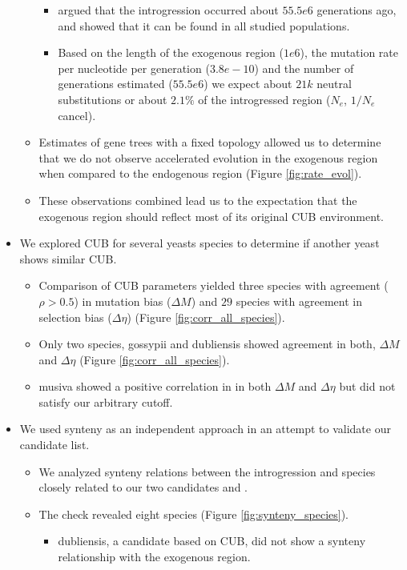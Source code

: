 \documentclass[12pt]{article}
\begin{document}
\begin{itemize}
\begin{itemize}
		\begin{itemize}
			\item \citep{friedrich2015} argued that the introgression occurred about $55.5e6$ generations ago, and showed that it can be found in all studied \kluyveri populations.
			\item Based on the length of the exogenous region ($1e6$), the mutation rate per nucleotide per generation ($3.8e-10$) and the number of generations estimated ($55.5e6$) we expect about $21k$ neutral substitutions or about $2.1 \%$ of the introgressed region ($N_e$, $1/N_e$ cancel).
		\end{itemize}
		\item Estimates of gene trees with a fixed topology allowed us to determine that we do not observe accelerated evolution in the exogenous region when compared to the endogenous region (Figure \ref{fig:rate_evol}).
		\item These observations combined lead us to the expectation that the exogenous region should reflect most of its original CUB environment.
	\end{itemize}
	\item We explored CUB for several yeasts species to determine if another yeast shows similar CUB.
	\begin{itemize}
		\item Comparison of CUB parameters yielded three species with agreement ($\rho > 0.5$) in mutation bias ($\Delta M$) and $29$ species with agreement in selection bias ($\Delta \eta$) (Figure \ref{fig:corr_all_species}).
		\item Only two species, gossypii and dubliensis showed agreement in both, $\Delta M$ and $\Delta \eta$ (Figure \ref{fig:corr_all_species}).
		\item musiva showed a positive correlation in in both $\Delta M$ and $\Delta \eta$ but did not satisfy our arbitrary cutoff.
	\end{itemize}
	\item We used synteny as an independent approach in an attempt to validate our candidate list.
	\begin{itemize}
	\item We analyzed synteny relations between the introgression and species closely related to our two candidates and \kluyveri.
	\item The check revealed eight species (Figure \ref{fig:synteny_species}).
		\begin{itemize}
			\item dubliensis, a candidate based on CUB, did not show a synteny relationship with the exogenous region.

\end{itemize}
\end{itemize}
\end{itemize}
\end{document}
